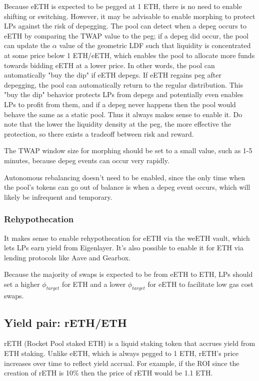 \documentclass[twocolumn]{article}
\begin{document}
Because eETH is expected to be pegged at 1 ETH, there is no need to enable shifting or switching. However, it may be advisable to enable morphing to protect LPs against the risk of depegging. The pool can detect when a depeg occurs to eETH by comparing the TWAP value to the peg; if a depeg did occur, the pool can update the $\alpha$ value of the geometric LDF such that liquidity is concentrated at some price below 1 ETH/eETH, which enables the pool to allocate more funds towards bidding eETH at a lower price. In other words, the pool can automatically "buy the dip" if eETH depegs. If eETH regains peg after depegging, the pool can automatically return to the regular distribution. This "buy the dip" behavior protects LPs from depegs and potentially even enables LPs to profit from them, and if a depeg never happens then the pool would behave the same as a static pool. Thus it always makes sense to enable it. Do note that the lower the liquidity density at the peg, the more effective the protection, so there exists a tradeoff between risk and reward.

The TWAP window size for morphing should be set to a small value, such as 1-5 minutes, because depeg events can occur very rapidly.

Autonomous rebalancing doesn't need to be enabled, since the only time when the pool's tokens can go out of balance is when a depeg event occurs, which will likely be infrequent and temporary.

\subsubsection{Rehypothecation}

It makes sense to enable rehypothecation for eETH via the weETH vault, which lets LPs earn yield from Eigenlayer. It's also possible to enable it for ETH via lending protocols like Aave and Gearbox.

Because the majority of swaps is expected to be from eETH to ETH, LPs should set a higher $\phi_{target}$ for ETH and a lower $\phi_{target}$ for eETH to facilitate low gas cost swaps.

\subsection{Yield pair: rETH/ETH}

rETH (Rocket Pool staked ETH)\cite{RocketPool} is a liquid staking token that accrues yield from ETH staking. Unlike eETH, which is always pegged to 1 ETH, rETH's price increases over time to reflect yield accrual. For example, if the ROI since the creation of rETH is 10\% then the price of rETH would be 1.1 ETH.
\end{document}
